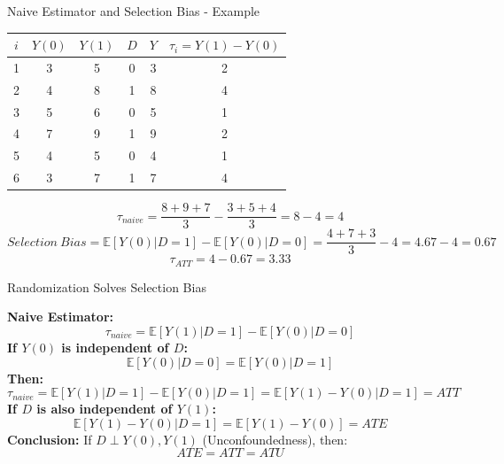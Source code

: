 \documentclass[xcolor=svgnames,t]{beamer}
\begin{document}
\begin{frame}{Naive Estimator and Selection Bias - Example}

    
    \centering
    \begin{table}[]
    \centering
    \begin{tabular}{|c|c|c|c|c|c|}
    \hline
    \( i \) & \( Y(0) \) & \( Y(1) \) & \( D \) & \( Y \) & \( \tau_i = Y(1) - Y(0) \) \\ \hline
    1 & 3  & 5  & 0 & 3 & 2 \\ \hline
    \rowcolor{blue!20} 2 & 4  & 8  & 1 & 8 & 4 \\ \hline
    3 & 5  & 6  & 0 & 5 & 1 \\ \hline
    \rowcolor{blue!20} 4 & 7  & 9  & 1 & 9 & 2 \\ \hline
    5 & 4  & 5  & 0 & 4 & 1 \\ \hline
    \rowcolor{blue!20} 6 & 3  & 7  & 1 & 7 & 4 \\ \hline
    \end{tabular}
    \end{table}
\pause
    \small{
        \[
            \tau_{naive} =  \frac{8 + 9 + 7}{3} - \frac{3 + 5 + 4}{3} =  8 - 4 = 4
        \]
        \pause\[
            Selection\ Bias = \mathbb{E}[Y(0) | D = 1] - \mathbb{E}[Y(0) | D = 0] = \frac{4 + 7 + 3}{3} - 4 = 4.67 - 4 = 0.67
        \]
        \pause \[
            \tau_{ATT} =  4 - 0.67 = 3.33
        \]
        }
             

\end{frame}

\begin{frame}{Randomization Solves Selection Bias}

    \small{
    \textbf{Naive Estimator:}
    \[
    \tau_{naive} = \mathbb{E}[Y(1) | D = 1] - \mathbb{E}[Y(0) | D = 0]
    \]
    \pause
    \textbf{If \( Y(0) \) is independent of \( D \):}
    \[
    \mathbb{E}[Y(0) | D = 0] = \mathbb{E}[Y(0) | D = 1]
    \]
    \pause
    \textbf{Then:}
    \[
    \tau_{naive} = \mathbb{E}[Y(1) | D = 1] - \mathbb{E}[Y(0) | D = 1] = \mathbb{E}[Y(1) - Y(0) | D = 1] = ATT
    \]
    \pause
    \textbf{If \( D \) is also independent of \( Y(1) \):}
    \[
    \mathbb{E}[Y(1) - Y(0) | D = 1] = \mathbb{E}[Y(1) - Y(0)] = ATE
    \]
    \pause
    \textbf{Conclusion:} If \( D \perp Y(0), Y(1) \) (Unconfoundedness), then:
    \[
    ATE = ATT = ATU
    \]
    }

\end{frame}
\end{document}
